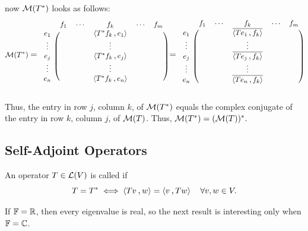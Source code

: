 \begin{prf}
  now $\mathcal{M}(T^*)$ looks as follows:
  \[
  \mmatrix(T^*)
  \;\mathlarger{=}\;
  \begin{blockarray}{cccccc}
    & f_1 & \cdots &  f_k      & \cdots & f_m \\
    \begin{block}{c(ccccc)}
      e_1    &  &  & \ip{T^* f_k}{e_1} & & \\
      \vdots &  &  & \vdots            & & \\
      e_j    &  &  & \ip{T^* f_k}{e_j} & & \\
      \vdots &  &  & \vdots            & & \\
      e_n    &  &  & \ip{T^* f_k}{e_n} & & \\
    \end{block}
  \end{blockarray}
  \;\mathlarger{=}\;
  \begin{blockarray}{cccccc}
    & f_1 & \cdots &  f_k      & \cdots & f_m \\
    \begin{block}{c(ccccc)}
      e_1    &  &  & \overline{\ip{T e_1}{f_k}} & & \\
      \vdots &  &  & \vdots            & & \\
      e_j    &  &  & \overline{\ip{T e_j}{f_k}} & & \\
      \vdots &  &  & \vdots            & & \\
      e_n    &  &  & \overline{\ip{T e_n}{f_k}} & & \\
    \end{block}
  \end{blockarray}
  \]


  Thus, the entry in row $j$, column $k$, of $\mathcal{M}(T^*)$ equals the complex conjugate of the entry in row $k$, column $j$, of $\mathcal{M}(T)$. Thus,
    $\mathcal{M}(T^*) = (\mathcal{M}(T))^*.$
\end{prf}

\subsection{Self-Adjoint Operators}

\begin{mydef}
  An operator $T \in \mathcal{L}(V)$ is called  if
  \[
    T = T^* \iff \ip{Tv}{w} = \ip{v}{Tw} \quad \forall v,w \in V.
  \]
\end{mydef}

If $\mathbb{F} = \mathbb{R}$, then every eigenvalue is real, so the next result is interesting only when $\mathbb{F} = \mathbb{C}$.

